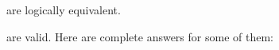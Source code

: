 \noSeq
\nextSeq
\nextSeq
\noSeq
\lastSeq
\noSeq
are logically equivalent.

\noSeq%
\nextSeq%
\noSeq%
\nextSeq%
\nextSeq%
\noSeq%
\nextSeq%
\noSeq%
\noSeq%
\lastSeq%
are valid. Here are complete answers for some of them:
